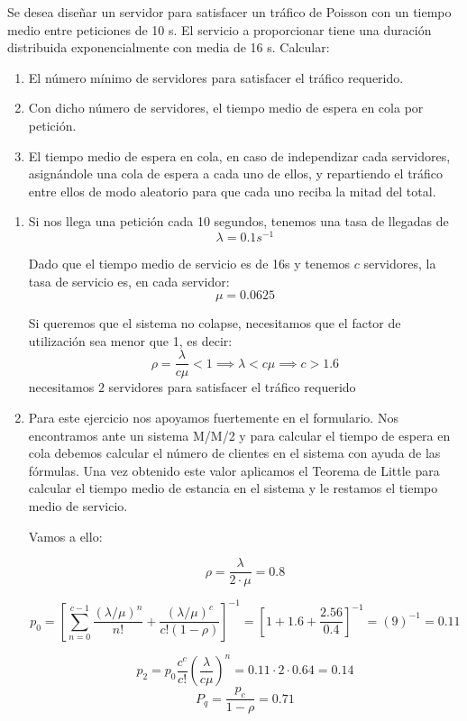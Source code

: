 \begin{problem}[3]
Se desea diseñar un servidor para satisfacer un tráfico de Poisson con un tiempo medio entre peticiones de 10 s. El servicio a proporcionar tiene una duración distribuida exponencialmente con media de 16 s. Calcular:
\begin{enumerate}
\item El número mínimo de servidores para satisfacer el tráfico requerido.
\item Con dicho número de servidores, el tiempo medio de espera en cola por petición.
\item El tiempo medio de espera en cola, en caso de independizar cada servidores, asignándole una cola de espera a cada uno de ellos, y repartiendo el tráfico entre ellos de modo aleatorio para que cada uno reciba la mitad del total.
\end{enumerate}

\solution

\begin{enumerate}
\item

Si nos llega una petición cada 10 segundos, tenemos una tasa de llegadas de
\[λ = 0.1 s^{-1}\]

Dado que el tiempo medio de servicio es de 16s y tenemos $c$ servidores, la tasa de servicio es, en cada servidor:
\[μ=0.0625\]

Si queremos que el sistema no colapse, necesitamos que el factor de utilización sea menor que 1, es decir:
\[ρ = \frac{λ}{cμ}<1 \implies λ < cμ \implies c>1.6\]
necesitamos $\boxed{2}$ servidores para satisfacer el tráfico requerido
\item

Para este ejercicio nos apoyamos fuertemente en el formulario. Nos encontramos ante un sistema M/M/2 y para calcular el tiempo de espera en cola debemos calcular el número de clientes en el sistema con ayuda de las fórmulas. Una vez obtenido este valor aplicamos el Teorema de Little para calcular el tiempo medio de estancia en el sistema y le restamos el tiempo medio de servicio.

Vamos a ello:

\[ρ = \frac{λ}{2\cdot μ}=0.8\]

\[p_0 = \left[ \sum_{n=0}^{c-1}\frac{(λ/μ)^n}{n!}+\frac{(λ/μ)^c}{c!(1-ρ)}\right]^{-1}=\left[1+1.6+\frac{2.56}{0.4}\right]^{-1}=(9)^{-1}=0.11\]

\[p_2=p_0\frac{c^c}{c!}\left( \frac{λ}{cμ}\right)^n=0.11\cdot 2 \cdot 0.64 = 0.14\]
\[P_q=\frac{p_c}{1-ρ}=0.71\]


\end{enumerate}
\end{problem}
